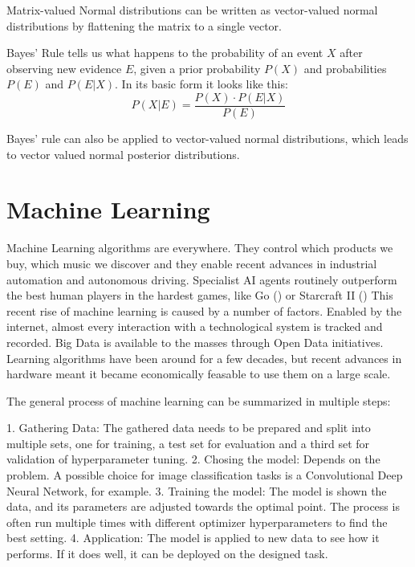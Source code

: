 \documentclass[twoside,12pt,a4paper]{report}
\begin{document}
Matrix-valued Normal distributions can be written as vector-valued normal distributions by flattening the matrix to a single vector.

Bayes' Rule tells us what happens to the probability of an event $X$ after observing new evidence $E$, given a prior probability $P(X)$ and probabilities $P(E)$ and $P(E|X)$. In its basic form it looks like this:
$$ P(X|E) = \frac{P(X) \cdot P(E|X)}{P(E)}$$

Bayes' rule can also be applied to vector-valued normal distributions, which leads to vector valued normal posterior distributions.

\section{Machine Learning}
Machine Learning algorithms are everywhere. They control which products we buy, which music we discover and they enable recent advances in industrial automation and autonomous driving. Specialist AI agents routinely outperform the best human players in the hardest games, like Go (\cite{gibney2016google}) or Starcraft II (\cite{vinyals2019alphastar})
This recent rise of machine learning is caused by a number of factors. Enabled by the internet, almost every interaction with a technological system is tracked and recorded. Big Data is available to the masses through Open Data initiatives.
Learning algorithms have been around for a few decades, but recent advances in hardware meant it became economically feasable to use them on a large scale.

The general process of machine learning can be summarized in multiple steps:
\\

\begin{markdown}
1. Gathering Data: The gathered data needs to be prepared and split into multiple sets, one for training, a test set for evaluation and a third set for validation of hyperparameter tuning.
2. Chosing the model: Depends on the problem. A possible choice for image classification tasks is a Convolutional Deep Neural Network, for example.
3. Training the model: The model is shown the data, and its parameters are adjusted towards the optimal point. The process is often run multiple times with different optimizer hyperparameters to find the best setting.
4. Application: The model is applied to new data to see how it performs. If it does well, it can be deployed on the designed task.
\end{markdown}
\end{document}
